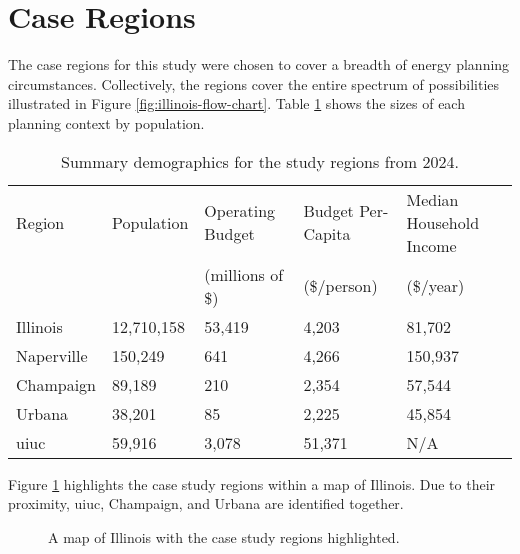 \section{Case Regions}
\label{section:cases}

The case regions for this study were chosen to cover a breadth of energy
planning circumstances. Collectively, the regions cover the entire spectrum of
possibilities illustrated in Figure \ref{fig:illinois-flow-chart}. Table
\ref{tab:demographics} shows the sizes of each planning context by population.

\begin{table}[htbp!]
    \centering
    \caption{Summary demographics for the study regions from 2024.}
    \label{tab:demographics}
    \begin{tabular}{lllll}
        \toprule
        Region & Population & Operating Budget & Budget Per-Capita & Median
        Household Income \\
        & & (millions of \$) & (\$/person) &(\$/year) \\
        \midrule
        Illinois
        \cite{united_states_census_bureau_quickfacts_2024-3,sturm_illinois_2024}&
        12,710,158  & 53,419 & 4,203 & 81,702\\
        Naperville
        \cite{united_states_census_bureau_quickfacts_2024-2,munch_annual_2024} &
        150,249  & 641 & 4,266 & 150,937 \\
        Champaign
        \cite{united_states_census_bureau_quickfacts_2024,nees_adopted_2024} &
        89,189 & 210 & 2,354 & 57,544 \\
        Urbana \cite{united_states_census_bureau_quickfacts_2024-1,
        ho_city_2024}& 38,201 & 85 & 2,225 & 45,854 \\
        \ac{uiuc} \cite{data_usa_university_2022,
        university_of_illinois_system_fy_2024} & 59,916 & 3,078 & 51,371 & N/A
        \\
        \bottomrule
    \end{tabular}
\end{table}

Figure \ref{fig:illinois-plot} highlights the case study regions within a map of
Illinois. Due to their proximity, \ac{uiuc}, Champaign, and Urbana are
identified together.

\begin{figure}[ht!]
    \centering
    \resizebox{0.4\columnwidth}{!}{}
    \caption{A map of Illinois with the case study regions highlighted.}
    \label{fig:illinois-plot}
\end{figure}

